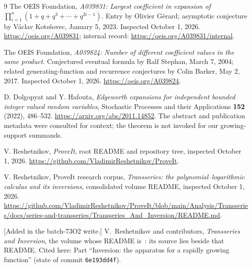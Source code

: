 \documentclass[11pt,a4paper]{article}
\numberwithin{equation}{section}
\theoremstyle{definition}\newtheorem{definition}[theorem]{Definition}
\theoremstyle{remark}\newtheorem{remark}[theorem]{Remark}
\begin{document}
\begin{thebibliography}{9}
The OEIS Foundation, \emph{A039831: Largest coefficient in expansion of
$\prod_{i=1}^n(1+q+q^3+\cdots+q^{2i-1})$}.
Entry by Olivier G\'erard; asymptotic conjecture by V\'aclav Kote\v{s}ovec,
January 5, 2023. Inspected October 1, 2026.
\url{https://oeis.org/A039831}; internal record:
\url{https://oeis.org/A039831/internal}.

The OEIS Foundation, \emph{A039824: Number of different coefficient
values in the same product}. Conjectured eventual formula by Ralf
Stephan, March 7, 2004; related generating-function and recurrence
conjectures by Colin Barker, May 2, 2017. Inspected October 1, 2026.
\url{https://oeis.org/A039824}.

D. Dolgopyat and Y. Hafouta,
\emph{Edgeworth expansions for independent bounded integer valued
random variables}, Stochastic Processes and their Applications
\textbf{152} (2022), 486--532.
\url{https://arxiv.org/abs/2011.14852}.
The abstract and publication metadata were consulted for context;
the theorem is not invoked for our growing-support summands.

V. Reshetnikov, \emph{ProveIt}, root README and repository tree,
inspected October 1, 2026.
\url{https://github.com/VladimirReshetnikov/ProveIt}.

V. Reshetnikov, ProveIt research corpus,
\emph{Transseries: the polynomial--logarithmic calculus and its
inversions}, consolidated volume README, inspected October 1, 2026.
\url{https://github.com/VladimirReshetnikov/ProveIt/blob/main/Analysis/Transseries/docs/series-and-transseries/Transseries_And_Inversion/README.md}.

\begingroup\raggedright
[Added in the batch-73O2 write.] V.~Reshetnikov and contributors,
\emph{Transseries and Inversion}, the volume whose README is~\cite{transseries}:
its source  lies beside that README. Cited here: Part ``Inversion: the apparatus for a rapidly growing function''
(state of commit \texttt{6e193dd4f}).\par\endgroup
\end{thebibliography}
\end{document}
